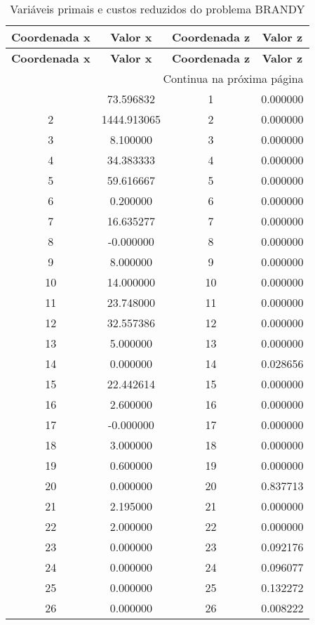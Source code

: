 \documentclass[12pt]{article}
\begin{document}
\begin{longtable}{@{}cccc@{}}
\caption{Variáveis primais e custos reduzidos do problema BRANDY} \\
\toprule
\textbf{Coordenada x} & \textbf{Valor x} & \textbf{Coordenada z} & \textbf{Valor z} \\
\midrule
\endfirsthead

\toprule
\textbf{Coordenada x} & \textbf{Valor x} & \textbf{Coordenada z} & \textbf{Valor z} \\
\midrule
\endhead

\midrule \multicolumn{4}{r}{{Continua na próxima página}} \\ \midrule
\endfoot

\bottomrule
\endlastfoot
1 & 73.596832 & 1 & 0.000000 \\
2 & 1444.913065 & 2 & 0.000000 \\
3 & 8.100000 & 3 & 0.000000 \\
4 & 34.383333 & 4 & 0.000000 \\
5 & 59.616667 & 5 & 0.000000 \\
6 & 0.200000 & 6 & 0.000000 \\
7 & 16.635277 & 7 & 0.000000 \\
8 & -0.000000 & 8 & 0.000000 \\
9 & 8.000000 & 9 & 0.000000 \\
10 & 14.000000 & 10 & 0.000000 \\
11 & 23.748000 & 11 & 0.000000 \\
12 & 32.557386 & 12 & 0.000000 \\
13 & 5.000000 & 13 & 0.000000 \\
14 & 0.000000 & 14 & 0.028656 \\
15 & 22.442614 & 15 & 0.000000 \\
16 & 2.600000 & 16 & 0.000000 \\
17 & -0.000000 & 17 & 0.000000 \\
18 & 3.000000 & 18 & 0.000000 \\
19 & 0.600000 & 19 & 0.000000 \\
20 & 0.000000 & 20 & 0.837713 \\
21 & 2.195000 & 21 & 0.000000 \\
22 & 2.000000 & 22 & 0.000000 \\
23 & 0.000000 & 23 & 0.092176 \\
24 & 0.000000 & 24 & 0.096077 \\
25 & 0.000000 & 25 & 0.132272 \\
26 & 0.000000 & 26 & 0.008222 \\

\end{longtable}
\end{document}
